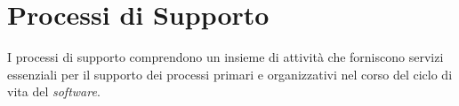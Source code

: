 \section{Processi di Supporto}

I processi di supporto comprendono un insieme di attività che forniscono
servizi essenziali per il supporto dei processi primari e organizzativi nel
corso del ciclo di vita del \textit{software}.









